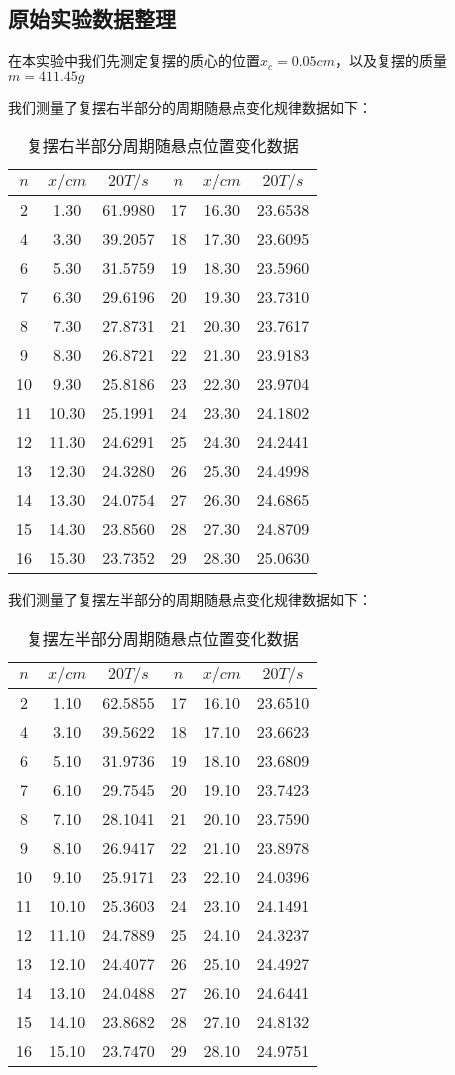 \documentclass[a4 paper,12pt]{article}
\begin{document}
\subsection{原始实验数据整理}
在本实验中我们先测定复摆的质心的位置$x_{c}=0.05cm$，以及复摆的质量$m=411.45g$
\par 我们测量了复摆右半部分的周期随悬点变化规律数据如下：
\begin{table}[H]
	\caption{复摆右半部分周期随悬点位置变化数据}
	\centering
	\begin{tabular}{|ccc||ccc|}
		\toprule[0.5mm]
		$n$&$x/cm$&$20T/s$&$n$&$x/cm$&$20T/s$\\
		\midrule
		2&1.30&61.9980&17&16.30&23.6538\\
		4&3.30&39.2057&18&17.30&23.6095\\
		6&5.30&31.5759&19&18.30&23.5960\\
		7&6.30&29.6196&20&19.30&23.7310\\
		8&7.30&27.8731&21&20.30&23.7617\\
		9&8.30&26.8721&22&21.30&23.9183\\
		10&9.30&25.8186&23&22.30&23.9704\\
		11&10.30&25.1991&24&23.30&24.1802\\
		12&11.30&24.6291&25&24.30&24.2441\\
		13&12.30&24.3280&26&25.30&24.4998\\
		14&13.30&24.0754&27&26.30&24.6865\\
		15&14.30&23.8560&28&27.30&24.8709\\
		16&15.30&23.7352&29&28.30&25.0630\\
		\bottomrule[0.5mm]
	\end{tabular}
\end{table}
\par 我们测量了复摆左半部分的周期随悬点变化规律数据如下：
\begin{table}[H]
	\caption{复摆左半部分周期随悬点位置变化数据}
	\centering
	\begin{tabular}{|ccc||ccc|}
		\toprule[0.5mm]
		$n$&$x/cm$&$20T/s$&$n$&$x/cm$&$20T/s$\\
		\midrule
		2&1.10&62.5855&17&16.10&23.6510\\
		4&3.10&39.5622&18&17.10&23.6623\\
		6&5.10&31.9736&19&18.10&23.6809\\
		7&6.10&29.7545&20&19.10&23.7423\\
		8&7.10&28.1041&21&20.10&23.7590\\
		9&8.10&26.9417&22&21.10&23.8978\\
		10&9.10&25.9171&23&22.10&24.0396\\
		11&10.10&25.3603&24&23.10&24.1491\\
		12&11.10&24.7889&25&24.10&24.3237\\
		13&12.10&24.4077&26&25.10&24.4927\\
		14&13.10&24.0488&27&26.10&24.6441\\
		15&14.10&23.8682&28&27.10&24.8132\\
		16&15.10&23.7470&29&28.10&24.9751\\
		\bottomrule[0.5mm]
	\end{tabular}
\end{table}
\end{document}
